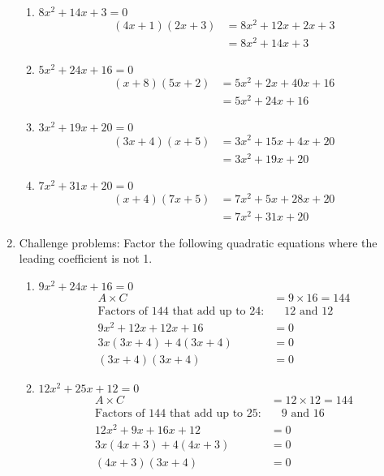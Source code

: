 \documentclass[12pt]{article}
\begin{document}
\begin{enumerate}
\begin{enumerate}
        \item $8x^2 + 14x + 3 = 0$
        \begin{align*}
            (4x + 1)(2x + 3) &= 8x^2 + 12x + 2x + 3 \\
            &= 8x^2 + 14x + 3
        \end{align*}
        
        \item $5x^2 + 24x + 16 = 0$
        \begin{align*}
            (x + 8)(5x + 2) &= 5x^2 + 2x + 40x + 16 \\
            &= 5x^2 + 24x + 16
        \end{align*}
        
        \item $3x^2 + 19x + 20 = 0$
        \begin{align*}
            (3x + 4)(x + 5) &= 3x^2 + 15x + 4x + 20 \\
            &= 3x^2 + 19x + 20
        \end{align*}
        
        \item $7x^2 + 31x + 20 = 0$
        \begin{align*}
            (x + 4)(7x + 5) &= 7x^2 + 5x + 28x + 20 \\
            &= 7x^2 + 31x + 20
        \end{align*}
    \end{enumerate}

    \item Challenge problems: Factor the following quadratic equations where the leading coefficient is not 1.
    \begin{enumerate}
        \item $9x^2 + 24x + 16 = 0$
        \begin{align*}
            A \times C & = 9 \times 16 = 144 \\
            \text{Factors of 144 that add up to 24:} & \quad 12 \text{ and } 12 \\
            9x^2 + 12x + 12x + 16 &= 0 \\
            3x(3x + 4) + 4(3x + 4) &= 0 \\
            (3x + 4)(3x + 4) &= 0
        \end{align*}
        
        \item $12x^2 + 25x + 12 = 0$
        \begin{align*}
            A \times C & = 12 \times 12 = 144 \\
            \text{Factors of 144 that add up to 25:} & \quad 9 \text{ and } 16 \\
            12x^2 + 9x + 16x + 12 &= 0 \\
            3x(4x + 3) + 4(4x + 3) &= 0 \\
            (4x + 3)(3x + 4) &= 0
        \end{align*}
        

\end{enumerate}
\end{enumerate}
\end{document}
